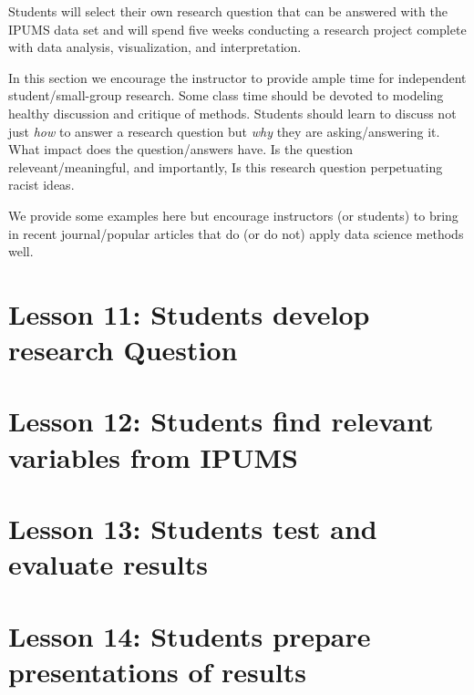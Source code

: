 \documentclass[
]{book}
\begin{document}
Students will select their own research question that can be answered with the IPUMS data set and will spend five weeks conducting a research project complete with data analysis, visualization, and interpretation.

In this section we encourage the instructor to provide ample time for independent student/small-group research. Some class time should be devoted to modeling healthy discussion and critique of methods. Students should learn to discuss not just \emph{how} to answer a research question but \emph{why} they are asking/answering it. What impact does the question/answers have. Is the question releveant/meaningful, and importantly, Is this research question perpetuating racist ideas.

We provide some examples here but encourage instructors (or students) to bring in recent journal/popular articles that do (or do not) apply data science methods well.

\hypertarget{lesson-11-students-develop-research-question}{%
\section*{Lesson 11: Students develop research Question}\label{lesson-11-students-develop-research-question}}

\hypertarget{lesson-12-students-find-relevant-variables-from-ipums}{%
\section*{Lesson 12: Students find relevant variables from IPUMS}\label{lesson-12-students-find-relevant-variables-from-ipums}}

\hypertarget{lesson-13-students-test-and-evaluate-results}{%
\section*{Lesson 13: Students test and evaluate results}\label{lesson-13-students-test-and-evaluate-results}}

\hypertarget{lesson-14-students-prepare-presentations-of-results}{%
\section*{Lesson 14: Students prepare presentations of results}\label{lesson-14-students-prepare-presentations-of-results}}
\end{document}
